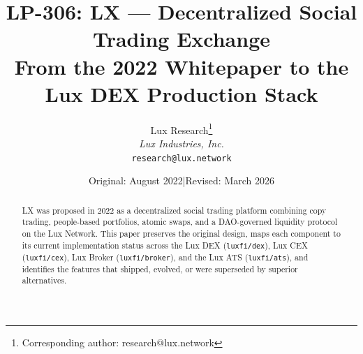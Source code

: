\documentclass[11pt,a4paper]{article}
\title{LP-306: LX --- Decentralized Social Trading Exchange\\[4pt]
\large From the 2022 Whitepaper to the Lux DEX Production Stack}
\author{
Lux Research\thanks{Corresponding author: research@lux.network}\\
\textit{Lux Industries, Inc.}\\
\texttt{research@lux.network}
}
\date{Original: August 2022\quad|\quad Revised: March 2026}
\begin{document}
\luxcoverpage

\begin{abstract}
LX was proposed in 2022 as a decentralized social trading platform
combining copy trading, people-based portfolios, atomic swaps, and
a DAO-governed liquidity protocol on the Lux Network. This paper
preserves the original design, maps each component to its current
implementation status across the Lux DEX
(\texttt{luxfi/dex}), Lux CEX (\texttt{luxfi/cex}), Lux Broker
(\texttt{luxfi/broker}), and the Lux ATS (\texttt{luxfi/ats}), and
identifies the features that shipped, evolved, or were superseded by
superior alternatives.
\end{abstract}

\tableofcontents
\newpage









\end{document}
